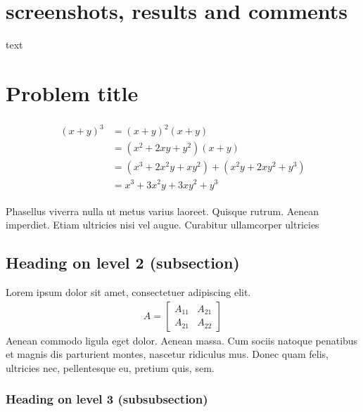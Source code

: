 \documentclass[paper=a4, fontsize=11pt]{scrartcl} %
\numberwithin{equation}{section} %
\numberwithin{figure}{section} %
\numberwithin{table}{section} %
\begin{document}
\section{screenshots, results and comments}
text


\section{Problem title}

\lipsum[2] %

\begin{align} 
\begin{split}
(x+y)^3 	&= (x+y)^2(x+y)\\
&=(x^2+2xy+y^2)(x+y)\\
&=(x^3+2x^2y+xy^2) + (x^2y+2xy^2+y^3)\\
&=x^3+3x^2y+3xy^2+y^3
\end{split}					
\end{align}

Phasellus viverra nulla ut metus varius laoreet. Quisque rutrum. Aenean imperdiet. Etiam ultricies nisi vel augue. Curabitur ullamcorper ultricies


\subsection{Heading on level 2 (subsection)}

Lorem ipsum dolor sit amet, consectetuer adipiscing elit. 
\begin{align}
A = 
\begin{bmatrix}
A_{11} & A_{21} \\
A_{21} & A_{22}
\end{bmatrix}
\end{align}
Aenean commodo ligula eget dolor. Aenean massa. Cum sociis natoque penatibus et magnis dis parturient montes, nascetur ridiculus mus. Donec quam felis, ultricies nec, pellentesque eu, pretium quis, sem.


\subsubsection{Heading on level 3 (subsubsection)}
\end{document}
